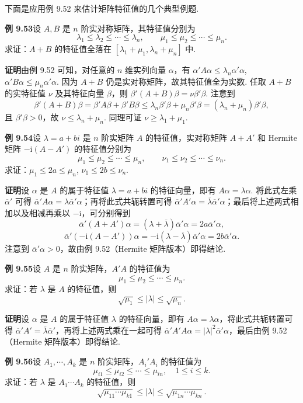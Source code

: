 \documentclass[UTF8,12pt,a4paper,fontset=fandol]{ctexart}
\begin{document}
下面是应用例 9.52 来估计矩阵特征值的几个典型例题.

\noindent\textbf{例 9.53}\quad 设 $A,B$ 是 $n$ 阶实对称矩阵，其特征值分别为
\[
\lambda_1\le\lambda_2\le\cdots\le\lambda_n,\qquad
\mu_1\le\mu_2\le\cdots\le\mu_n.
\]
求证：$A+B$ 的特征值全落在 $[\lambda_1+\mu_1,\lambda_n+\mu_n]$ 中.

\noindent\textbf{证明}\quad 由例 9.52 可知，对任意的 $n$ 维实列向量 $\alpha$，有 $\alpha'A\alpha\le\lambda_n\alpha'\alpha$, $\alpha'B\alpha\le\mu_n\alpha'\alpha$. 因为 $A+B$ 仍是实对称矩阵，故其特征值全为实数. 任取 $A+B$ 的实特征值 $\nu$ 及其特征向量 $\beta$，则 $\beta'(A+B)\beta=\nu\beta'\beta$. 注意到
\[
\beta'(A+B)\beta=\beta'A\beta+\beta'B\beta\le\lambda_n\beta'\beta+\mu_n\beta'\beta=(\lambda_n+\mu_n)\beta'\beta,
\]
且 $\beta'\beta>0$，故 $\nu\le\lambda_n+\mu_n$. 同理可证 $\nu\ge\lambda_1+\mu_1$.

\noindent\textbf{例 9.54}\quad 设 $\lambda=a+bi$ 是 $n$ 阶实矩阵 $A$ 的特征值，实对称矩阵 $A+A'$ 和 Hermite 矩阵 $-\mathrm{i}(A-A')$ 的特征值分别为
\[
\mu_1\le\mu_2\le\cdots\le\mu_n,\qquad \nu_1\le\nu_2\le\cdots\le\nu_n.
\]
求证：$\mu_1\le2a\le\mu_n$, $\nu_1\le2b\le\nu_n$.

\noindent\textbf{证明}\quad 设 $\alpha$ 是 $A$ 的属于特征值 $\lambda=a+bi$ 的特征向量，即有 $A\alpha=\lambda\alpha$. 将此式左乘 $\overline{\alpha}'$ 可得 $\overline{\alpha}'A\alpha=\lambda\overline{\alpha}'\alpha$；再将此式共轭转置可得 $\overline{\alpha}'A'\alpha=\overline{\lambda}\overline{\alpha}'\alpha$；最后将上述两式相加以及相减再乘以 $-\mathrm{i}$，可分别得到
\[
\overline{\alpha}'(A+A')\alpha=(\lambda+\overline{\lambda})\overline{\alpha}'\alpha=2a\overline{\alpha}'\alpha,
\]
\[
\overline{\alpha}'(-\mathrm{i}(A-A'))\alpha=-\mathrm{i}(\lambda-\overline{\lambda})\overline{\alpha}'\alpha=2b\overline{\alpha}'\alpha.
\]
注意到 $\overline{\alpha}'\alpha>0$，故由例 9.52（Hermite 矩阵版本）即得结论.

\noindent\textbf{例 9.55}\quad 设 $A$ 是 $n$ 阶实矩阵，$A'A$ 的特征值为
\[
\mu_1\le\mu_2\le\cdots\le\mu_n.
\]
求证：若 $\lambda$ 是 $A$ 的特征值，则
\[
\sqrt{\mu_1}\le|\lambda|\le\sqrt{\mu_n}.
\]

\noindent\textbf{证明}\quad 设 $\alpha$ 是 $A$ 的属于特征值 $\lambda$ 的特征向量，即有 $A\alpha=\lambda\alpha$，将此式共轭转置可得 $\overline{\alpha}'A'=\overline{\lambda}\overline{\alpha}'$，再将上述两式乘在一起可得 $\overline{\alpha}'A'A\alpha=|\lambda|^2\overline{\alpha}'\alpha$，最后由例 9.52（Hermite 矩阵版本）即得结论.

\noindent\textbf{例 9.56}\quad 设 $A_1,\cdots,A_k$ 是 $n$ 阶实矩阵，$A_i'A_i$ 的特征值为
\[
\mu_{i1}\le\mu_{i2}\le\cdots\le\mu_{in},\quad 1\le i\le k.
\]
求证：若 $\lambda$ 是 $A_1\cdots A_k$ 的特征值，则
\[
\sqrt{\mu_{11}\cdots\mu_{k1}}\le|\lambda|\le\sqrt{\mu_{1n}\cdots\mu_{kn}}.
\]
\end{document}
